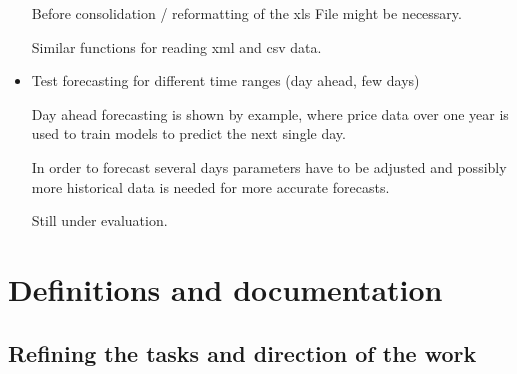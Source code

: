 \documentclass[a4paper]{article}
\begin{document}
\begin{itemize}
Before consolidation / reformatting of the xls File might be necessary. 

Similar functions for reading xml and csv data. 

\item Test forecasting for different time ranges (day ahead, few days)

Day ahead forecasting is shown by example, where price data over one year 
is used to train models to predict the next single day. 

In order to forecast several days parameters have to be adjusted and possibly 
more historical data is needed for more accurate forecasts. 

Still under evaluation. 

\end{itemize}

\pagebreak
\vspace{1em}

\hfill\date{Week 18, from 28.04. to 04.05.}

\section{Definitions and documentation}

\subsection{Refining the tasks and direction of the work}
\end{document}
